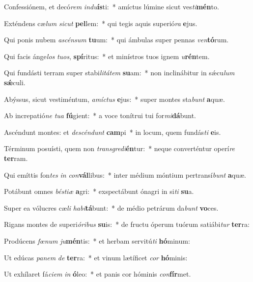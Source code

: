 \item Confessiónem, et decó\textit{rem} \textit{ind}\textit{u}\textbf{ís}ti:~* amíctus lúmine sicut ves\textit{ti}\textbf{mén}to.
\item Exténdens cæ\textit{lum} \textit{sic}\textit{ut} \textbf{pel}lem:~* qui tegis aquis superió\textit{ra} \textbf{e}jus.
\item Qui ponis nubem \textit{a}\textit{scén}\textit{sum} \textbf{tu}um:~* qui ámbulas super pennas \textit{ven}\textbf{tó}rum.
\item Qui facis ánge\textit{los} \textit{tu}\textit{os}, \textbf{spí}ritus:~* et minístros tuos ignem \textit{u}\textbf{rén}tem.
\item Qui fundásti terram super stabi\textit{li}\textit{tá}\textit{tem} \textbf{su}am:~* non inclinábitur in sǽcu\textit{lum} \textbf{sǽ}culi.
\item Abýssus, sicut vestiméntum, \textit{a}\textit{míc}\textit{tus} \textbf{e}jus:~* super montes sta\textit{bunt} \textbf{a}quæ.
\item Ab increpatió\textit{ne} \textit{tu}\textit{a} \textbf{fú}gient:~* a voce tonítrui tui for\textit{mi}\textbf{dá}bunt.
\item Ascéndunt montes: et \textit{de}\textit{scén}\textit{dunt} \textbf{cam}pi~* in locum, quem fundás\textit{ti} \textbf{e}is.
\item Términum posuísti, quem non \textit{trans}\textit{gre}\textit{di}\textbf{én}tur:~* neque converténtur operí\textit{re} \textbf{ter}ram.
\item Qui emíttis fon\textit{tes} \textit{in} \textit{con}\textbf{vál}libus:~* inter médium móntium pertransí\textit{bunt} \textbf{a}quæ.
\item Potábunt omnes \textit{bés}\textit{ti}\textit{æ} \textbf{a}gri:~* exspectábunt ónagri in si\textit{ti} \textbf{su}a.
\item Super ea vólucres cæ\textit{li} \textit{ha}\textit{bi}\textbf{tá}bunt:~* de médio petrárum da\textit{bunt} \textbf{vo}ces.
\item Rigans montes de superi\textit{ó}\textit{ri}\textit{bus} \textbf{su}is:~* de fructu óperum tuórum satiábi\textit{tur} \textbf{ter}ra:
\item Prodúcens \textit{fœ}\textit{num} \textit{ju}\textbf{mén}tis:~* et herbam servitú\textit{ti} \textbf{hó}minum:
\item Ut edúcas \textit{pa}\textit{nem} \textit{de} \textbf{ter}ra:~* et vinum lætíficet \textit{cor} \textbf{hó}minis:
\item Ut exhílaret fá\textit{ci}\textit{em} \textit{in} \textbf{ó}leo:~* et panis cor hóminis \textit{con}\textbf{fír}met.
